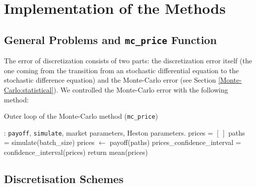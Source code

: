 \chapter{Implementation of the Methods}
    \section{General Problems and \texttt{mc\_price} Function}
        The error of discretization consists of two parts: the discretization error itself 
        (the one coming from the transition from an stochastic differential equation to the 
        stochastic difference equation) and the Monte-Carlo error (see Section \ref{Monte-Carlo:statistical}).
        We controlled the Monte-Carlo error with the following method:
        \begin{algorithm}
            \caption{Outer loop of the Monte-Carlo method (\texttt{mc\_price})}
            \label{alg:outer_loop}
            \begin{algorithmic}
                : \texttt{payoff}, \texttt{simulate}, market parameters, Heston parameters.
                \State prices = $\left[ \ \right]$
                    \State paths = simulate(batch\_size)
                    \State prices $\gets$ payoff(paths)
                    \State prices\_confidence\_interval = confidence\_interval(prices)
                \EndWhile
                \State return mean(prices)
            \end{algorithmic}
        \end{algorithm}

    \section{Discretisation Schemes}

